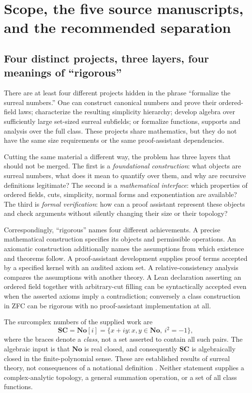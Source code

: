 \documentclass[11pt,letterpaper]{article}
\numberwithin{equation}{section}
\theoremstyle{definition}
\theoremstyle{remark}
\newcommand{\No}{\mathbf{No}}
\newcommand{\SC}{\mathbf{SC}}
\begin{document}
\section{Scope, the five source manuscripts, and the recommended separation}
\label{found:sec:scope}

\subsection{Four distinct projects, three layers, four meanings of ``rigorous''}
\label{found:sub:fourprojects}
There are at least four different projects hidden in the phrase ``formalize the
surreal numbers.'' One can construct canonical numbers and prove their
ordered-field laws; characterize the resulting simplicity hierarchy; develop
algebra over sufficiently large set-sized surreal subfields; or formalize
functions, supports and analysis over the full class. These projects share
mathematics, but they do not have the same size requirements or the same
proof-assistant dependencies.

Cutting the same material a different way, the problem has three layers that
should not be merged. The first is a \emph{foundational construction}: what
objects are surreal numbers, what does it mean to quantify over them, and why
are recursive definitions legitimate? The second is a \emph{mathematical
interface}: which properties of ordered fields, cuts, simplicity, normal forms
and exponentiation are available? The third is \emph{formal verification}: how
can a proof assistant represent these objects and check arguments without
silently changing their size or their topology?

Correspondingly, ``rigorous'' names four different achievements. A precise
mathematical construction specifies its objects and permissible operations. An
axiomatic construction additionally names the assumptions from which existence
and theorems follow. A proof-assistant development supplies proof terms
accepted by a specified kernel with an audited axiom set. A relative-consistency
analysis compares the assumptions with another theory. A Lean declaration
asserting an ordered field together with arbitrary-cut filling can be
syntactically accepted even when the asserted axioms imply a contradiction;
conversely a class construction in ZFC can be rigorous with no proof-assistant
implementation at all.

The surcomplex numbers of the supplied work are
\[
  \SC=\No[i]=\{x+iy:x,y\in\No,\ i^2=-1\},
\]
where the braces denote a \emph{class}, not a set asserted to contain all such
pairs. The algebraic input is that $\No$ is real closed, and consequently
$\SC$ is algebraically closed in the finite-polynomial sense. These are
established results of surreal theory, not consequences of a notational
definition \cite{found:Conway,found:Gonshor,found:Alling}. Neither statement
supplies a complex-analytic topology, a general summation operation, or a set
of all class functions.
\end{document}

